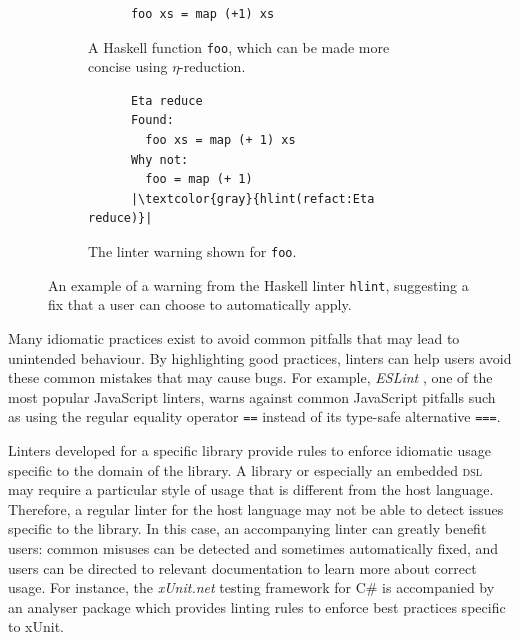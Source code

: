 \begin{figure}[htbp]
  \vspace{3ex} %
  \centering
  \begin{subfigure}{0.45\textwidth}
    \centering
    \begin{verbatim}
      foo xs = map (+1) xs
    \end{verbatim}
    \caption{A Haskell function \texttt{foo}, which can be made more concise using $\eta$-reduction.}
  \end{subfigure}
  \hfill
  \begin{subfigure}{0.45\textwidth}
    \centering
    \begin{verbatim}
      Eta reduce
      Found:
        foo xs = map (+ 1) xs
      Why not:
        foo = map (+ 1)
      |\textcolor{gray}{hlint(refact:Eta reduce)}|
    \end{verbatim}
    \caption{The linter warning shown for \texttt{foo}.}
  \end{subfigure}
  \caption{An example of a warning from the Haskell linter \texttt{hlint}, suggesting a fix that a user can choose to automatically apply.}
  \label{fig:hlint-example}
\end{figure}

Many idiomatic practices exist to avoid common pitfalls that may lead to unintended behaviour.
By highlighting good practices, linters can help users avoid these common mistakes that may cause bugs.
For example, \textit{ESLint} , one of the most popular JavaScript linters, warns against common JavaScript pitfalls such as using the regular equality operator \texttt{==} instead of its type-safe alternative \texttt{===}.

Linters developed for a specific library provide rules to enforce idiomatic usage specific to the domain of the library.
A library or especially an embedded \textsc{dsl} may require a particular style of usage that is different from the host language.
Therefore, a regular linter for the host language may not be able to detect issues specific to the library.
In this case, an accompanying linter can greatly benefit users: common misuses can be detected and sometimes automatically fixed, and users can be directed to relevant documentation to learn more about correct usage.
For instance, the \textit{xUnit.net} testing framework for C\# is accompanied by an analyser package \cite{xunit_xunitanalyzers_2024} which provides linting rules to enforce best practices specific to xUnit.

